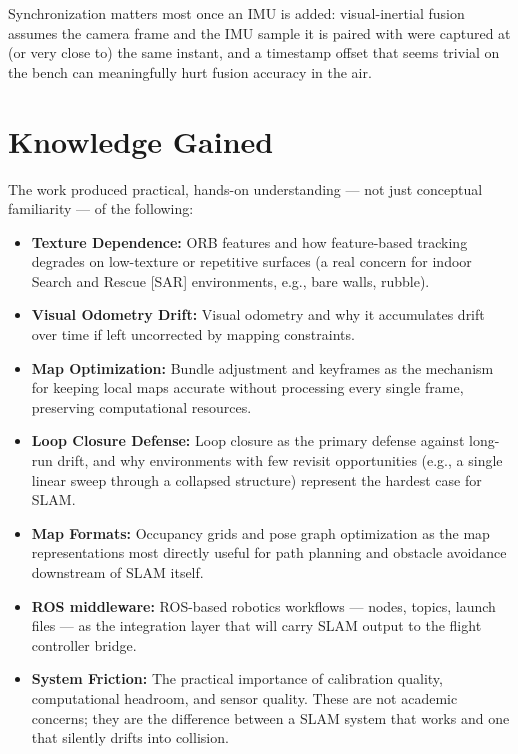 \documentclass[11pt,a4paper]{article}
\begin{document}
Synchronization matters most once an IMU is added: visual-inertial fusion assumes the camera frame and the IMU sample it is paired with were captured at (or very close to) the same instant, and a timestamp offset that seems trivial on the bench can meaningfully hurt fusion accuracy in the air.

\section{Knowledge Gained}
The work produced practical, hands-on understanding --- not just conceptual familiarity --- of the following:
\begin{itemize}
    \item \textbf{Texture Dependence:} ORB features and how feature-based tracking degrades on low-texture or repetitive surfaces (a real concern for indoor Search and Rescue [SAR] environments, e.g., bare walls, rubble).
    \item \textbf{Visual Odometry Drift:} Visual odometry and why it accumulates drift over time if left uncorrected by mapping constraints.
    \item \textbf{Map Optimization:} Bundle adjustment and keyframes as the mechanism for keeping local maps accurate without processing every single frame, preserving computational resources.
    \item \textbf{Loop Closure Defense:} Loop closure as the primary defense against long-run drift, and why environments with few revisit opportunities (e.g., a single linear sweep through a collapsed structure) represent the hardest case for SLAM.
    \item \textbf{Map Formats:} Occupancy grids and pose graph optimization as the map representations most directly useful for path planning and obstacle avoidance downstream of SLAM itself.
    \item \textbf{ROS middleware:} ROS-based robotics workflows --- nodes, topics, launch files --- as the integration layer that will carry SLAM output to the flight controller bridge.
    \item \textbf{System Friction:} The practical importance of calibration quality, computational headroom, and sensor quality. These are not academic concerns; they are the difference between a SLAM system that works and one that silently drifts into collision.
\end{itemize}
\end{document}
